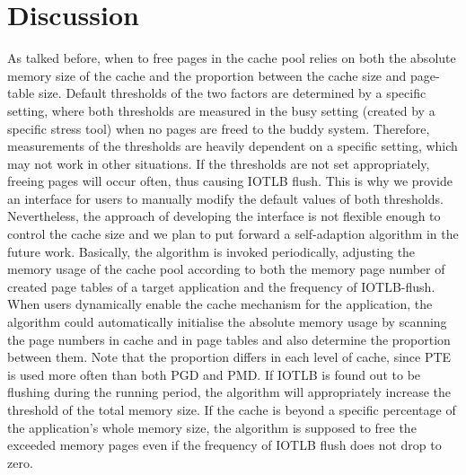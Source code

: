 \section{\name Discussion} \label{sec:dis}

As talked before, when to free pages in the cache pool relies on both the absolute memory size of the cache and the proportion between the cache size and page-table size. Default thresholds of the two factors are determined by a specific setting, where both thresholds are measured in the busy setting (created by a specific stress tool) when no pages are freed to the buddy system. Therefore, measurements of the thresholds are heavily dependent on a specific setting, which may not work in other situations. If the thresholds are not set appropriately, freeing pages will occur often, thus causing IOTLB flush. This is why we provide an interface for users to manually modify the default values of both thresholds. Nevertheless, the approach of developing the interface is not flexible enough to control the cache size and we plan to put forward a self-adaption algorithm in the future work. Basically, the algorithm is invoked periodically, adjusting the memory usage of the cache pool according to both the memory page number of created page tables of a target application and the frequency of IOTLB-flush. When users dynamically enable the cache mechanism for the application, the algorithm could automatically initialise the absolute memory usage by scanning the page numbers in cache and in page tables and also determine the proportion between them. Note that the proportion differs in each level of cache, since PTE is used more often than both PGD and PMD. If IOTLB is found out to be flushing during the running period, the algorithm will appropriately increase the threshold of the total memory size. If the cache is beyond a specific percentage of the application's whole memory size, the algorithm is supposed to free the exceeded memory pages even if the frequency of IOTLB flush does not drop to zero.


